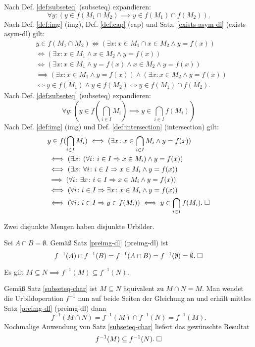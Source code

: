 \begin{Beweis}
Nach Def. \ref{def:subseteq} (subseteq) expandieren:
\[\forall y\colon (y\in f(M_1\cap M_2)\implies y\in f(M_1)\cap f(M_2)).\]
Nach Def. \ref{def:img} (img), Def. \ref{def:cap} (cap)
und Satz. \ref{exists-asym-dl} (exists-asym-dl) gilt:
\begin{align*}
& y\in f(M_1\cap M_2) \iff (\exists x\colon x\in M_1\cap x\in M_2\land y=f(x))\\
&\iff (\exists x\colon x\in M_1\land x\in M_2\land y=f(x))\\
&\iff (\exists x\colon x\in M_1\land y=f(x)\land x\in M_2\land y=f(x))\\
&\implies (\exists x\colon x\in M_1\land y=f(x))\land (\exists x\colon x\in M_2\land y=f(x))\\
&\iff y\in f(M_1)\land y\in f(M_2)\iff y\in f(M_1)\cap f(M_2).
\end{align*}
Nach Def. \ref{def:subseteq} (subseteq) expandieren:
\[\forall y\colon (y\in f(\bigcap_{i\in I} M_i)\implies y\in \bigcap_{i\in I} f(M_i))\]
Nach Def. \ref{def:img} (img) und Def. \ref{def:intersection} (intersection)
gilt:
\begin{align*}
& y\in f(\bigcap_{i\in I} M_i)\iff (\exists x\colon x\in\bigcap_{i\in I} M_i\land y=f(x))\\
& \iff (\exists x\colon (\forall i\colon i\in I\Rightarrow x\in M_i)\land y=f(x))\\
& \iff (\exists x\colon \forall i\colon i\in I\Rightarrow x\in M_i\land y=f(x))\\
& \implies (\forall i\colon\exists x\colon i\in I\Rightarrow x\in M_i\land y=f(x))\\
& \iff (\forall i\colon i\in I\Rightarrow \exists x\colon x\in M_i\land y=f(x))\\
& \iff (\forall i\colon i\in I\Rightarrow y\in f(M_i))
\iff y\in\bigcap_{i\in I} f(M_i).\;\square
\end{align*}
\end{Beweis}

\begin{Satz}\label{disjoint-preimg}
Zwei disjunkte Mengen haben disjunkte Urbilder.
\end{Satz}
\begin{Beweis} Sei $A\cap B=\emptyset$. Gemäß Satz
\ref{preimg-dl} (preimg-dl) ist
\[f^{-1}(A)\cap f^{-1}(B) = f^{-1}(A\cap B) = f^{-1}(\emptyset)
= \emptyset.\;\square\]
\end{Beweis}

\begin{Satz}
Es gilt $M\subseteq N\implies f^{-1}(M)\subseteq f^{-1}(N)$.
\end{Satz}
\begin{Beweis}[Beweis\;1]
Gemäß Satz \ref{subseteq-char} ist $M\subseteq N$ äquivalent zu
$M\cap N=M$. Man wendet die Urbildoperation $f^{-1}$ nun auf beide
Seiten der Gleichung an und erhält mittles Satz \ref{preimg-dl}
(preimg-dl) dann%
\[f^{-1}(M\cap N) = f^{-1}(M)\cap f^{-1}(N) = f^{-1}(M).\]
Nochmalige Anwendung von Satz \ref{subseteq-char} liefert
das gewünschte Resultat
\[f^{-1}(M)\subseteq f^{-1}(N).\;\square\]
\end{Beweis}

